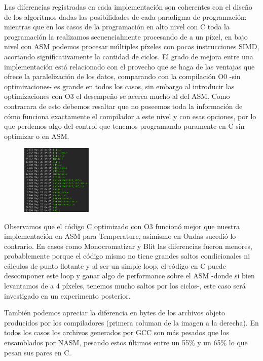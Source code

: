 Las diferencias registradas en cada implementación son coherentes con el diseño de los algoritmos dadas las posibilidades de cada paradigma de programación: mientras que en los casos de la programación en alto nivel con C toda la programación la realizamos secuencialmente procesando de a un píxel, en bajo nivel con ASM podemos procesar múltiples píxeles con pocas instrucciones SIMD, acortando significativamente la cantidad de ciclos. El grado de mejora entre una implementación está relacionado con el provecho que se haga de las ventajas que ofrece la paralelización de los datos, comparando con la compilación O0 -sin optimizaciones- es grande en todos los casos, sin embargo al introducir las optimizaciones con O3 el desempeño se acerca mucho al del ASM. Como contracara de esto debemos resaltar que no poseemos toda la información de cómo funciona exactamente el compilador a este nivel y con esas opciones, por lo que perdemos algo del control que tenemos programando puramente en C sin optimizar o en ASM.

\begin{figure}
	\centering
	\includegraphics[width=0.3\textwidth]{imagenes/testperformance/sizes.png}
\end{figure}

Observamos que el código C optimizado con O3 funcionó mejor que nuestra implementación en ASM para Temperature, asimismo en Ondas sucedió lo contrario. En casos como Monocromatizar y Blit las diferencias fueron menores, probablemente porque el código mismo no tiene grandes saltos condicionales ni cálculos de punto flotante y al ser un simple loop, el código en C puede descomponer este loop y ganar algo de performance sobre el ASM -donde si bien levantamos de a 4 píxeles, tenemos mucho saltos por los ciclos-, este caso será investigado en un experimento posterior.

También podemos apreciar la diferencia en bytes de los archivos objeto producidos por los compiladores (primera columan de la imagen a la derecha). En todos los casos los archivos generados por GCC son más pesados que los ensamblados por NASM, pesando estos últimos entre un 55\% y un 65\% lo que pesan sus pares en C.

